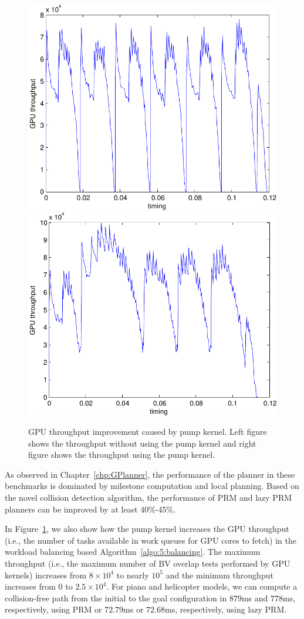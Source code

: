 \begin{figure}[h!]
  \centering
  \includegraphics[width=0.8\linewidth]{figs/5/nopump.pdf}
  \includegraphics[width=0.8\linewidth]{figs/5/pump.pdf}
  \caption[GPU throughput improvement caused by pump kernel]{GPU throughput improvement caused by pump kernel. Left figure shows the throughput without using the pump kernel
  and right figure shows the throughput using the pump kernel.}
  \label{fig:5:pump}
\end{figure}

As observed in Chapter~\ref{chp:GPlanner}, the performance of the planner in these benchmarks is
dominated by milestone computation and local planning. Based on the novel collision detection algorithm, the performance of PRM
and lazy PRM planners can be improved by at least 40\%-45\%.

In Figure~\ref{fig:5:pump}, we also show how the pump kernel increases the GPU throughput (i.e., the number of
tasks available in work queues for GPU cores to fetch) in the workload balancing based Algorithm~\ref{algo:5:balancing}.
The maximum throughput (i.e., the maximum number of BV overlap tests performed by GPU kernels) increases from $8\times 10^4$
to nearly $10^5$ and the minimum throughput increases from $0$ to $2.5\times 10^4$. For piano and helicopter models,
we can compute a collision-free path from the initial to the goal configuration in $879$ms and $778$ms, respectively,
using PRM or $72.79$ms or $72.68$ms, respectively, using lazy PRM.



